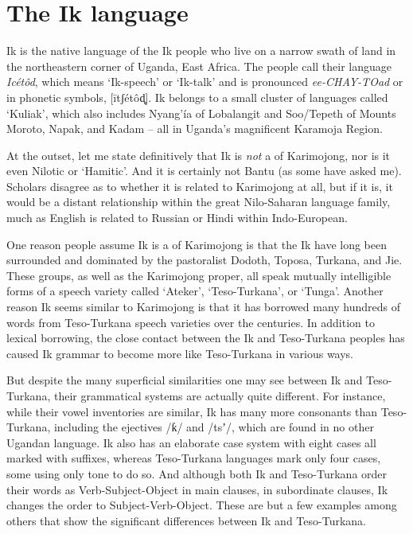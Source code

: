 \section{The Ik language}\label{sec:1.1}  
Ik is the native language of the Ik people who live on a narrow swath of land in the northeastern corner of Uganda, East Africa. The people call their language \textit{Icétôd}, which means ‘Ik-speech’ or ‘Ik-talk’ and is pronounced \textit{ee-CHAY-TOad} or in phonetic symbols, [\={i}tʃétôd̻]. Ik belongs to a small cluster of languages called ‘Kuliak’, which also includes Nyang’ía of Lobalangit and Soo/Tepeth of Mounts Moroto, Napak, and Kadam – all in Uganda’s magnificent Karamoja Region. 

At the outset, let me state definitively that Ik is \textit{not }a  of Karimojong, nor is it even Nilotic or ‘Hamitic’. And it is certainly not Bantu (as some have asked me). Scholars disagree as to whether it is related to Karimojong at all, but if it is, it would be a distant relationship within the great Nilo-Saharan language family, much as English is related to Russian or Hindi within Indo-European.

One reason people assume Ik is a  of Karimojong is that the Ik have long been surrounded and dominated by the pastoralist Dodoth, Toposa, Turkana, and Jie. These groups, as well as the Karimojong proper, all speak mutually intelligible forms of a speech variety called ‘Ateker’, ‘Teso-Turkana’, or ‘Tunga’. Another reason Ik seems similar to Karimojong is that it has borrowed many hundreds of words from Teso-Turkana speech varieties over the centuries. In addition to lexical borrowing, the close contact between the Ik and Teso-Turkana peoples has caused Ik grammar to become more like Teso-Turkana in various ways.

But despite the many superficial similarities one may see between Ik and Teso-Turkana, their grammatical systems are actually quite different. For instance, while their vowel inventories are similar, Ik has many more consonants than Teso-Turkana, including the ejectives /ƙ/ and /tsʼ/, which are found in no other Ugandan language. Ik also has an elaborate case system with eight cases all marked with suffixes, whereas Teso-Turkana languages mark only four cases, some using only tone to do so. And although both Ik and Teso-Turkana order their words as Verb-Subject-Object in main clauses, in subordinate clauses, Ik changes the order to Subject-Verb-Object. These are but a few examples among others that show the significant differences between Ik and Teso-Turkana.


